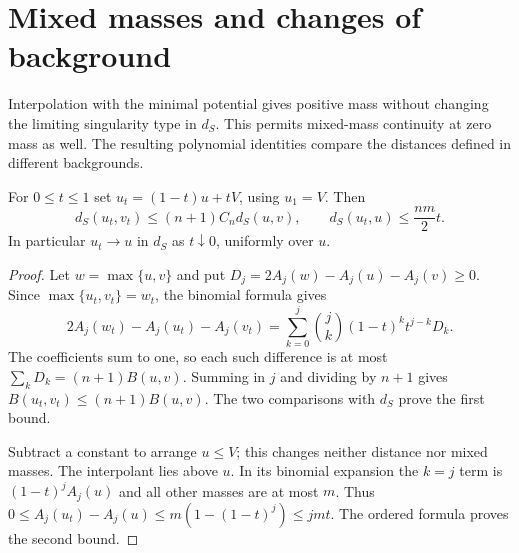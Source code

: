 \section{Mixed masses and changes of background}
\label{sec:singularity-mixed-mass-convergence}
Interpolation with the minimal potential gives positive mass without changing the limiting singularity type in $d_S$. This permits mixed-mass continuity at zero mass as well. The resulting polynomial identities compare the distances defined in different backgrounds.

\begin{lemma}\label{lem:singularity-minimal-interpolation}
For $0\leq t\leq1$ set $u_t=(1-t)u+tV$, using $u_1=V$. Then
\[
 d_S(u_t,v_t)\leq(n+1)C_n d_S(u,v),\qquad
 d_S(u_t,u)\leq\frac{nm}{2}t.
\]
In particular $u_t\to u$ in $d_S$ as $t\downarrow0$, uniformly over $u$.
\end{lemma}
\begin{proof}
Let $w=\max\{u,v\}$ and put $D_j=2A_j(w)-A_j(u)-A_j(v)\geq0$. Since $\max\{u_t,v_t\}=w_t$, the binomial formula gives
\[
 2A_j(w_t)-A_j(u_t)-A_j(v_t)
  =\sum_{k=0}^j\binom jk(1-t)^k t^{j-k}D_k.
\]
The coefficients sum to one, so each such difference is at most $\sum_kD_k=(n+1)B(u,v)$. Summing in $j$ and dividing by $n+1$ gives $B(u_t,v_t)\leq(n+1)B(u,v)$. The two comparisons with $d_S$ prove the first bound.

Subtract a constant to arrange $u\leq V$; this changes neither distance nor mixed masses. The interpolant lies above $u$. In its binomial expansion the $k=j$ term is $(1-t)^jA_j(u)$ and all other masses are at most $m$. Thus
$0\leq A_j(u_t)-A_j(u)\leq m(1-(1-t)^j)\leq jmt$. The ordered formula proves the second bound.
\end{proof}

